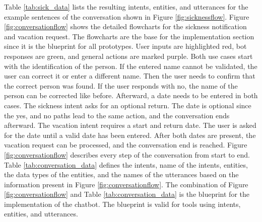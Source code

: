 Table \ref{tab:sick_data} lists the resulting intents, entities, and utterances for the example sentences of the conversation shown in Figure \ref{fig:sicknessflow}.
 Figure \ref{fig:conversationflow} shows the detailed flowcharts for the sickness notification and vacation request. 
The flowcharts are the base for the implementation section since it is the blueprint for all prototypes.
 User inputs are highlighted red, bot responses are green, and general actions are marked purple.
 Both use cases start with the identification of the person.
 If the entered name cannot be validated, the user can correct it or enter a different name.
 Then the user needs to confirm that the correct person was found.
 If the user responds with no, the name of the person can be corrected like before.
Afterward, a date needs to be entered in both cases. 
The sickness intent asks for an optional return.
The date is optional since the yes, and no paths lead to the same action, and the conversation ends afterward.
 The vacation intent requires a start and return date.
 The user is asked for the date until a valid date has been entered.
 After both dates are present, the vacation request can be processed, and the conversation end is reached.
Figure \ref{fig:conversationflow} describes every step of the conversation from start to end.
 Table \ref{tab:conversation_data} defines the intents, name of the intents, entities, the data types of the entities, and the names of the utterances based on the information present in Figure \ref{fig:conversationflow}.
 The combination of Figure \ref{fig:conversationflow} and Table \ref{tab:conversation_data} is the blueprint for the implementation of the chatbot.
 The blueprint is valid for tools using intents, entities, and utterances.
 
